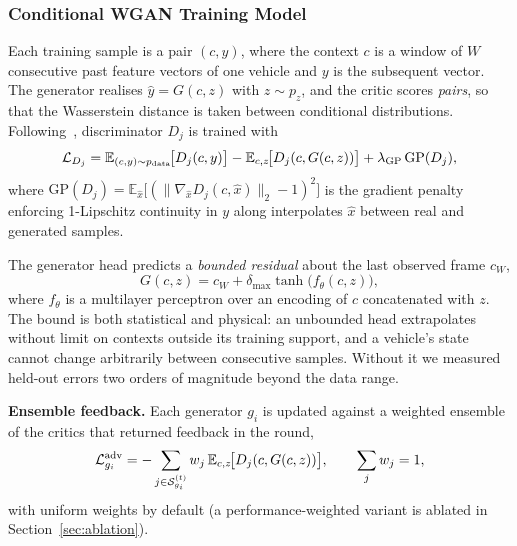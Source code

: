 \documentclass[journal]{IEEEtran}
\begin{document}
\subsubsection{Conditional WGAN Training Model}
Each training sample is a pair $(c,y)$, where the context $c$ is a window of
$W$ consecutive past feature vectors of one vehicle and $y$ is the subsequent
vector. The generator realises $\hat{y}=G(c,z)$ with $z\sim p_z$, and the
critic scores \emph{pairs}, so that the Wasserstein distance is taken between
conditional distributions. Following~\cite{arjovsky2017wgan}, discriminator
$D_j$ is trained with
\begin{equation}
\mathcal{L}_{D_j}=\mathbb{E}_{(c,y)\sim p_{\rm data}}\!\big[D_j(c,y)\big]
 -\mathbb{E}_{c,z}\!\big[D_j(c,G(c,z))\big]
 +\lambda_{\rm GP}\,\mathrm{GP}(D_j),
\label{eq:critic}
\end{equation}
where $\mathrm{GP}(D_j)=\mathbb{E}_{\hat{x}}\big[(\|\nabla_{\hat{x}}D_j(c,\hat{x})\|_2-1)^2\big]$
is the gradient penalty enforcing 1-Lipschitz continuity in $y$ along
interpolates $\hat{x}$ between real and generated samples.

The generator head predicts a \emph{bounded residual} about the last observed
frame $c_W$,
\begin{equation}
G(c,z)=c_W+\delta_{\max}\tanh\!\big(f_\theta(c,z)\big),
\label{eq:gen}
\end{equation}
where $f_\theta$ is a multilayer perceptron over an encoding of $c$
concatenated with $z$. The bound is both statistical and physical: an unbounded
head extrapolates without limit on contexts outside its training support, and a
vehicle's state cannot change arbitrarily between consecutive samples. Without
it we measured held-out errors two orders of magnitude beyond the data range.

\textbf{Ensemble feedback.} Each generator $g_i$ is updated against a weighted
ensemble of the critics that returned feedback in the round,
\begin{equation}
\mathcal{L}^{\rm adv}_{g_i}=-\sum_{j\in\mathcal{S}^{(t)}_{g_i}} w_j\,
 \mathbb{E}_{c,z}\!\big[D_j(c,G(c,z))\big],\qquad \sum_j w_j=1,
\label{eq:ensemble}
\end{equation}
with uniform weights by default (a performance-weighted variant is ablated in
Section~\ref{sec:ablation}).
\end{document}
